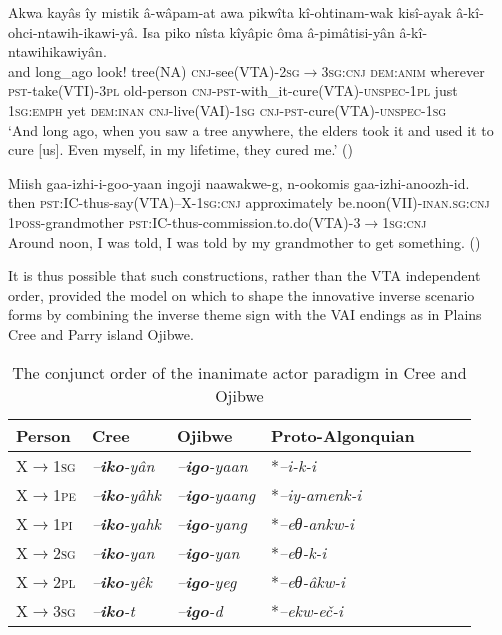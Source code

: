 \documentclass[twoside,a4paper,11pt]{article}
\newcommand{\ipa}[1]{{\phon\textit{#1}}}
\newcommand{\sg}{\textsc{sg}}
\newcommand{\pl}{\textsc{pl}}
\newcommand{\grise}[1]{\cellcolor{lightgray}\textbf{#1}}
\newcommand{\anim}{\textsc{anim}}
\newcommand{\cnj}{\textsc{cnj}}
\newcommand{\dem}{\textsc{dem}}
\newcommand{\emphat}{\textsc{emph}}
\newcommand{\inan}{\textsc{inan}}
\newcommand{\pli}{\textsc{pi}}
\newcommand{\pe}{\textsc{pe}}
\newcommand{\poss}{\textsc{poss}}
\newcommand{\pst}{\textsc{pst}}
\newcommand{\unspec}{\textsc{unspec}}
\begin{document}
\begin{exe}
 \ex \label{ex:woodscreeunspec}

\gll Akwa kayâs îy mistik â-wâpam-at awa pikwîta kî-ohtinam-wak kisî-ayak â-kî-ohci-ntawih-ikawi-yâ. {Isa piko} nîsta kîyâpic ôma â-pimâtisi-yân â-kî-ntawihikawiyân.\\
and long\_ago look! tree(NA) {\cnj-see(VTA)-2\sg$\rightarrow$3\sg:\cnj} {\dem{:}\anim} wherever {\pst-take(VTI)-3\pl} old-person {\cnj-\pst-with\_it-cure(VTA)-\unspec-1\pl} just {1\sg{:}\emphat} yet {\dem{:}\inan} {\cnj-live(VAI)-1\sg} {\cnj-\pst-cure(VTA)-\unspec-1\sg}\\
\glt `And long ago, when you saw a tree anywhere, the elders took it and used it to cure [us]. Even myself, in my lifetime, they cured me.' (\citealp[p. 9]{speakingtothefuture})
\end{exe}

\begin{exe}
\ex \label{ex:anoozhid}
\gll Miish gaa-izhi-i-goo-yaan ingoji naawakwe-g, n-ookomis gaa-izhi-anoozh-id. \\
then \pst:IC-thus-say(VTA)--X-1\sg:\cnj{} approximately be.noon(VII)-\textsc{inan.sg:cnj} 1\poss-grandmother  \pst:IC-thus-commission.to.do(VTA)-3$\rightarrow$1\sg:\cnj{} \\
\glt Around noon, I was told, I was told by my grandmother to get something. (\citealt[96]{kegg93portage})
\end{exe}

 It is thus possible that such constructions, rather than the VTA independent order, provided the model on which to shape the innovative inverse scenario forms by combining the inverse theme sign with the VAI endings as in Plains Cree and Parry island Ojibwe.

\begin{table}[htbp]
\caption{The conjunct order of the inanimate actor paradigm in Cree and Ojibwe} \label{tab:inan} \centering
\begin{tabular}{lllllll}
\toprule
Person &   Cree & Ojibwe      &Proto-Algonquian\\
\midrule
X$\rightarrow$1\sg& \ipa{--\textbf{iko}-yân} \grise{} &\ipa{--\textbf{igo}-yaan} \grise{}  & *\ipa{--i-k-i} \\
X$\rightarrow$1\pe & \ipa{--\textbf{iko}-yâhk} \grise{}   &\ipa{--\textbf{igo}-yaang} \grise{}  & *\ipa{--iy-amenk-i} \\
X$\rightarrow$1\pli & \ipa{--\textbf{iko}-yahk} \grise{}  &\ipa{--\textbf{igo}-yang} \grise{}  & *\ipa{--eθ-ankw-i} \\
\midrule
X$\rightarrow$2\sg& \ipa{--\textbf{iko}-yan} \grise{} &\ipa{--\textbf{igo}-yan} \grise{}  & *\ipa{--eθ-k-i} \\
X$\rightarrow$2\pl& \ipa{--\textbf{iko}-yêk} \grise{} &\ipa{--\textbf{igo}-yeg} \grise{}  & *\ipa{--eθ-âkw-i}  \\
\midrule
X$\rightarrow$3\sg& \ipa{--\textbf{iko}-t}   &\ipa{--\textbf{igo}-d}  & *\ipa{--ekw-eč-i} \\
\bottomrule
\end{tabular}
\end{table}
 
\end{document}
